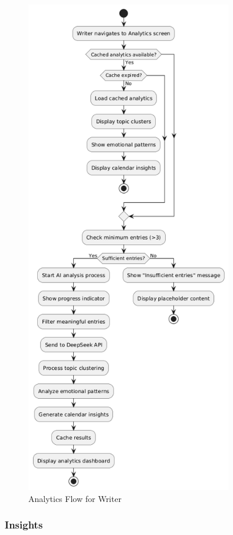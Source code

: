\begin{figure}[H]
\centering
\includegraphics[width=0.8\textwidth]{files/imgs/analytics_flow.png}
\caption{Analytics Flow for Writer}
\label{fig:analytics-flow}
\end{figure}

\subsubsection{Insights}\label{subsubsec:insights}

